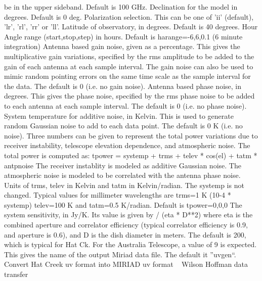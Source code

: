 be in the upper sideband. Default is 100 GHz.
Declination for the model in degrees. Default is 0 deg.
Polarization selection. This can be one of 'ii' (default), 'lr',
'rl', 'rr' or 'll'.
Latitude of observatory, in degrees. Default is 40 degrees.
Hour Angle range (start,stop,step) in hours. Default is
harange=-6,6,0.1 (6 minute integration)
Antenna based gain noise, given as a percentage. This gives the
multiplicative gain variations, specified by the rms amplitude to be
added to the gain of each antenna at each sample interval. The gain
noise can also be used to mimic random pointing errors on the same
time scale as the sample interval for the data.
The default is 0 (i.e. no gain noise).
Antenna based phase noise, in degrees. This gives the phase
noise, specified by the rms phase noise to be added to each
antenna at each sample interval. The default is 0 (i.e. no
phase noise).
System temperature for additive noise, in Kelvin. This is used
to generate random Gaussian noise to add to each data point. The
default is 0 K (i.e. no noise).
Three numbers can be given to represent the total power variations
due to receiver instability, telescope elevation dependence, and
atmospheric noise. The total power is computed as:
{\eightpoint\begintt
  tpower = systemp + trms + telev * cos(el) + tatm * antpnoise
\endtt}
The receiver instablity is modeled as additive Gaussian noise.
The atmospheric noise is modeled to be correlated with the antenna
phase noise. Units of trms, telev in Kelvin and tatm in Kelvin/radian.
The systemp is not changed. Typical values for millimeter wavelengths
are trms=1 K (10-4 * systemp) telev=100 K and tatm=0.5 K/radian.
Default is tpower=0,0,0
The system sensitivity, in Jy/K. Its value is given by
{\eightpoint{} / (eta * D**2)
\endtt}
where eta is the combined aperture and correlator efficiency
(typical correlator efficiency is 0.9, and aperture is 0.6),
and D is the dish diameter in meters. The default is 200, which
is typical for Hat Ck. For the Australia Telescope, a value of
9 is expected.
This gives the name of the output Miriad data file. The default
it ''uvgen``.
%
\noindent Convert Hat Creek uv format into MIRIAD uv format
\newline \ 
\newline {} Wilson Hoffman
\newline {} data transfer
